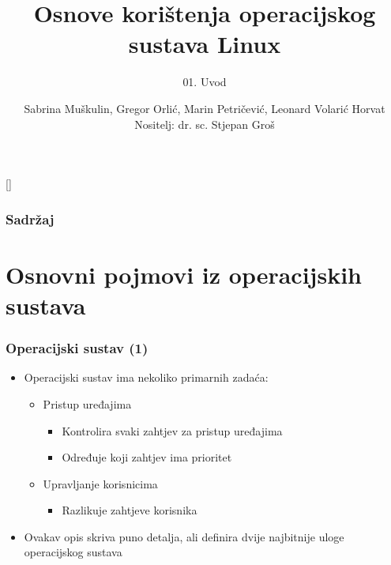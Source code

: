 \documentclass{beamer}
\title{Osnove korištenja operacijskog sustava Linux}
\subtitle{01. Uvod}
\author[Sabrina Miškulin, Gregor Orlić, Marin Petričević, Leonard Volarić Horvat]{Sabrina Muškulin, Gregor Orlić, Marin Petričević, Leonard Volarić Horvat\\{\small Nositelj: dr. sc. Stjepan Groš}}
\institute[FER]{Sveučilište u Zagrebu \\
				Fakultet elektrotehnike i računarstva}
\date{\todayiso}
\begin{document}
{
[] %

\begin{frame}
\maketitle
\end{frame}
}

\begin{frame}
\frametitle{Sadržaj}
\tableofcontents
\end{frame}

\section{Osnovni pojmovi iz operacijskih sustava}
\begin{frame}[t]
\frametitle{Operacijski sustav (1)}
\begin{itemize}
	\item Operacijski sustav ima nekoliko primarnih zadaća:
  \begin{itemize}
    \item Pristup uređajima
    \begin{itemize}
      \item Kontrolira svaki zahtjev za pristup uređajima
      \item Određuje koji zahtjev ima prioritet
    \end{itemize}
    \item Upravljanje korisnicima
    \begin{itemize}
      \item Razlikuje zahtjeve korisnika
    \end{itemize}
	\end{itemize}
  \item Ovakav opis skriva puno detalja, ali definira dvije najbitnije uloge
        operacijskog sustava
\end{itemize}
\end{frame}
\end{document}
